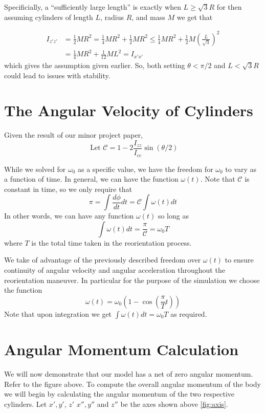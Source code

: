 \documentclass[12]{amsart}
\theoremstyle{definition}
\newcommand{\deriv}[2]{\frac{d#1}{d#2}}
\begin{document}
Specificially, a ``sufficiently large length'' is exactly when $L \geq \sqrt{3}R$ for then assuming cylinders of length $L$, radius $R$, and mass $M$ we get that

\begin{align*}
  I_{z'z'} &= \frac{1}{2} MR^2 = \frac{1}{4} MR^2 + \frac{1}{2} MR^2 \leq \frac{1}{4} MR^2 + \frac{1}{2} M \left( \frac{L}{\sqrt{3}} \right)^2 \\
  &= \frac{1}{4} MR^2 + \frac{1}{12} ML^2 = I_{x'x'}
\end{align*}
which gives the assumption given earlier. So, both setting $\theta < \pi/2$ and $L < \sqrt{3}R$ could lead to issues with stability.

\section{The Angular Velocity of Cylinders}

Given the result of our minor project paper,
\begin{equation*}
  \text{ Let }\mathcal{C} = 1-2 \frac{I_{zz}}{I_{cc}} \sin(\theta/2)
\end{equation*}

While we solved for $\omega_0$ as a specific value, we have the freedom for
$\omega_0$ to vary as a function of time. In general, we can have the function
$\omega(t)$. Note that $\mathcal{C}$ is constant in time, so we only require
that
\begin{equation*}
  \pi = \int \deriv{\phi}{t} dt = \mathcal{C} \int \omega(t) dt
\end{equation*}
In other words, we can have any function $\omega(t)$ so long as
\begin{equation*}
  \int \omega(t) dt = \frac{\pi}{\mathcal{C}} = \omega_0 T
\end{equation*}
where $T$ is the total time taken in the reorientation process.

We take of advantage of the previously described freedom over $\omega(t)$ to ensure continuity of angular velocity and angular acceleration throughout the reorientation maneuver. In particular for the purpose of the simulation we choose the function
\begin{equation*}
  \omega(t) = \omega_0\left(1-\cos\left( \frac{\pi}{T} t \right) \right)
\end{equation*}
Note that upon integration we get $\int \omega(t) dt = \omega_0 T$ as required.

\section{Angular Momentum Calculation}
We will now demonstrate that our model has a net of zero angular momentum. Refer to the figure above. To compute the overall angular momentum of the body we will begin by calculating the angular momentum of the two respective cylinders. Let $x',y'$, $z'$ $x'', y''$ and $z''$ be the axes shown above \ref{fig:axis}.
\end{document}
